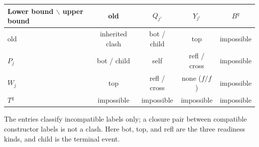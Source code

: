 \begin{center}
\small
\begin{tabular}{@{}lcccc@{}}
\toprule
Lower bound $\backslash$ upper bound & old & $Q_{j'}$ & $Y_{j'}$ & $B^q$\\
\midrule
old & inherited clash & bot / child & top & impossible\\
$P_j$ & bot / child & self & refl / cross & impossible\\
$W_j$ & top & refl / cross & none ($f/f$) & impossible\\
$T^q$ & impossible & impossible & impossible & impossible\\
\bottomrule
\end{tabular}
\end{center}
The entries classify incompatible labels only; a closure pair between
compatible constructor labels is not a clash. Here bot, top, and refl
are the three readiness kinds, and child is the terminal event.

